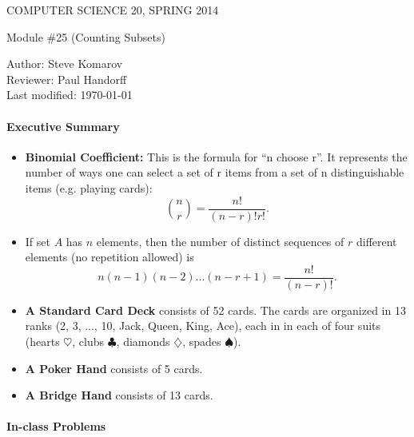 \documentclass[12pt]{article}
\begin{document}
\begin{center}
COMPUTER SCIENCE 20, SPRING 2014 \\

\smallskip

Module \#25 (Counting Subsets)
\end{center}
Author: Steve Komarov\\
Reviewer: Paul Handorff\\
Last modified: \today

\medskip


\paragraph*{Executive Summary}
\begin{itemize}


\item {\bf Binomial Coefficient:} This is the formula for ``n choose r''. It represents the number of ways one can select a set of r items from a set of n distinguishable items (e.g. playing cards):
$$
\binom{n}{r}=\frac{n!}{(n-r)! r!}.
$$ 

\item
If set $A$ has $n$ elements, then the number of distinct sequences of $r$ different elements (no repetition allowed) is
$$
n(n-1)(n-2)...(n-r+1)
=
\frac{n!}{(n-r)!}.
$$

\item {\bf A Standard Card Deck} consists of 52 cards. The cards are organized in 13 ranks (2, 3, ..., 10, Jack, Queen, King, Ace), each in in each of four suits (hearts $\heartsuit$, clubs $\clubsuit$, diamonds $\diamondsuit$, spades $\spadesuit$). 

\item {\bf A Poker Hand} consists of 5 cards. 

\item {\bf A Bridge Hand} consists of 13 cards. 




\end{itemize}

\pagebreak

\paragraph*{In-class Problems}
\end{document}
